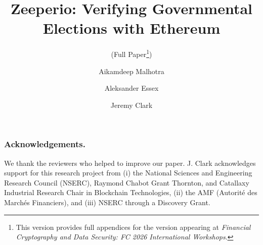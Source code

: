 \documentclass[runningheads]{llncs}
\begin{document}
\title{Zeeperio: Verifying Governmental Elections with Ethereum}
\subtitle{(Full Paper\footnote{This version provides full appendices for the version appearing at \textit{Financial Cryptography and Data Security: FC 2026 International Workshops}. })}


\author{
	Aikamdeep Malhotra \and 
	Aleksander Essex \and 
	Jeremy Clark
	}


\maketitle








\subsubsection*{Acknowledgements.} We thank the reviewers who helped to improve our paper. J. Clark acknowledges support for this research project from (i) the National Sciences and Engineering Research Council (NSERC), Raymond Chabot Grant Thornton, and Catallaxy Industrial Research Chair in Blockchain Technologies, (ii) the AMF (Autorité des Marchés Financiers), and (iii) NSERC through a Discovery Grant. 





\appendix
%




\end{document}
